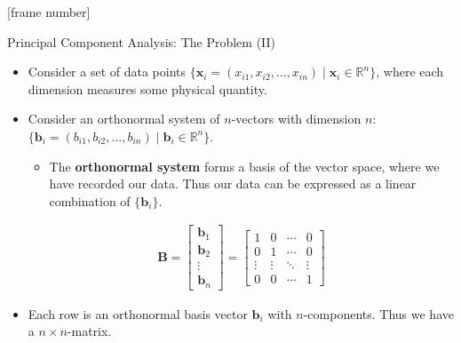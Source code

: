 \documentclass[aspectratio=169,t]{beamer}
\begin{document}
  {
    [frame number]
    \begin{frame}{Principal Component Analysis: The Problem (II)}
    \begin{itemize}
      \item Consider a set of data points $\{\mathbf{x}_i = (x_{i1},x_{i2},\ldots,x_{in}) \; \vert \; \mathbf{x}_i \in \mathbb{R}^n \}$, where each dimension measures some physical quantity.
      \item Consider an orthonormal system of $n$-vectors with dimension $n$: $\{\mathbf{b}_i = (b_{i1},b_{i2},\ldots,b_{in}) \; \vert \; \mathbf{b}_i \in \mathbb{R}^n \}$.
      \begin{itemize}
        \item The \textbf{orthonormal system} forms a basis of the vector space, where we have recorded our data. Thus our data can be expressed as a linear combination of $\{\mathbf{b}_i\}$.
      \end{itemize}
      \begin{align}
        \mathbf{B} = \begin{bmatrix}
          \mathbf{b}_1 \\
          \mathbf{b}_2 \\
          \vdots \\
          \mathbf{b}_n
        \end{bmatrix} = \begin{bmatrix}
          1 & 0 & \cdots & 0 \\
          0 & 1 & \cdots & 0 \\
          \vdots & \vdots & \ddots & \vdots \\
          0 & 0 & \cdots & 1
        \end{bmatrix}
      \end{align}
      \item Each row is an orthonormal basis vector $\mathbf{b}_i$ with $n$-components. Thus we have a $n \times n$-matrix.
    \end{itemize}
    \end{frame}
  }
\end{document}
